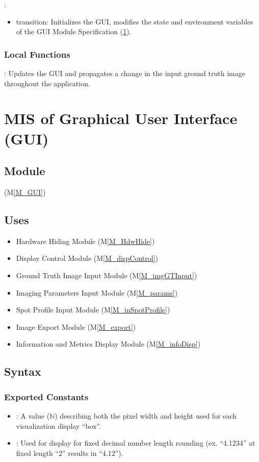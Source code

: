 \documentclass[12pt, titlepage]{article}
\newcommand{\mref}[1]{M\ref{#1}}
\newcommand{\mrefp}[1]{(\mref{#1})}
\newcommand{\mreff}[1]{Module \mrefp{#1}}
\newcommand{\msref}[1]{Module Specification (\ref{#1})}
\begin{document}
\noindent {}:
\begin{itemize}
\item transition: Initializes the GUI, modifies the state and environment variables of the GUI \msref{MS_GUI}.
\end{itemize}

\subsubsection{Local Functions}
: Updates the GUI and propagates a change in the input ground truth
image throughout the application.
\newpage



\section{MIS of Graphical User Interface (GUI)} \label{MS_GUI}

\subsection{Module}
 \mrefp{M_GUI}

\subsection{Uses}
\begin{itemize}
  \item Hardware Hiding \mreff{M_HdwHide}
  \item Display Control \mreff{M_dispControl}
  \item Ground Truth Image Input \mreff{M_imgGTInput}
  \item Imaging Parameters Input \mreff{M_params}
  \item Spot Profile Input \mreff{M_inSpotProfile}
  \item Image Export \mreff{M_export}
  \item Information and Metrics Display \mreff{M_infoDisp}
\end{itemize}

\subsection{Syntax}

\subsubsection{Exported Constants}
\begin{itemize}
  \item {}: A value ($\mathbb{N}$) describing both the pixel width and height used for each visualization display ``box''.
  \item {}: Used for display for fixed decimal number length
    rounding (ex. ``4.1234'' at fixed length ``2'' results in ``4.12'').
\end{itemize}
\end{document}
